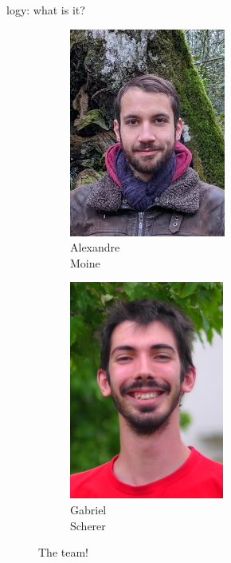 \begin{frame}[fragile]{\Zoo[]logy: what is it?}
\begin{overbox}
\begin{figure}
\begin{subfigure}{0.24\textwidth}
        \end{subfigure}
        \begin{subfigure}{0.24\textwidth}
            \includegraphics[scale=0.3]{images/alexandre_moine.jpg}
            \caption*{\footnotesize Alexandre \\ Moine}
        \end{subfigure}
        \begin{subfigure}{0.24\textwidth}
            \includegraphics[scale=1.2]{images/gabriel_scherer.jpg}
            \caption*{\footnotesize Gabriel \\ Scherer}
        \end{subfigure}
        \caption*{The \Pstore team!}
    \end{figure}
\end{overbox}


\end{frame}
